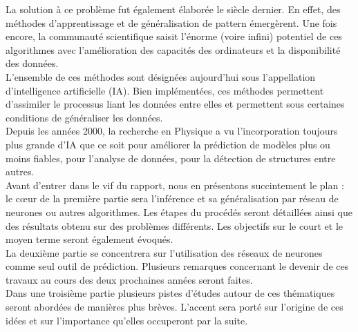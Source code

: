 \documentclass[a4paper,12pt]{article}
\numberwithin{equation}{section} %
\begin{document}
La solution à ce problème fut également élaborée le siècle dernier. En effet, des méthodes d'apprentissage et de généralisation de pattern émergèrent. Une fois encore, la communauté scientifique saisit l'énorme (voire infini) potentiel de ces algorithmes avec l'amélioration des capacités des ordinateurs et la disponibilité des données.\\ L'ensemble de ces méthodes sont désignées aujourd'hui sous l'appellation d'intelligence artificielle (IA). Bien implémentées, ces méthodes permettent d'assimiler le processus liant les données entre elles et permettent sous certaines conditions de généraliser les données.\\

\noindent Depuis les années 2000, la recherche en Physique a vu l'incorporation toujours plus grande d'IA que ce soit pour améliorer la prédiction de modèles plus ou moins fiables, pour l'analyse de données, pour la détection de structures entre autres. \\
Avant d'entrer dans le vif du rapport, nous en présentons succintement le plan : le cœur de la première partie sera l'inférence et sa généralisation par réseau de neurones ou autres algorithmes. Les étapes du procédés seront détaillées ainsi que des résultats obtenu sur des problèmes différents. Les objectifs sur le court et le moyen terme seront également évoqués.\\
La deuxième partie se concentrera sur l'utilisation des réseaux de neurones comme seul outil de prédiction. Plusieurs remarques concernant le devenir de ces travaux au cours des deux prochaines années seront faites.\\
Dans une troisième partie plusieurs pistes d'études autour de ces thématiques seront abordées de manières plus brèves. L'accent sera porté sur l'origine de ces idées et sur l'importance qu'elles occuperont par la suite.

\pagebreak
\end{document}
